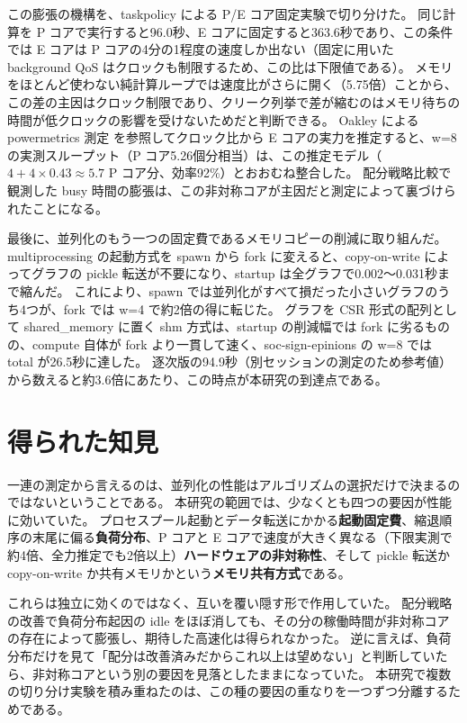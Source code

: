 この膨張の機構を、taskpolicy による P/E コア固定実験で切り分けた。
同じ計算を P コアで実行すると96.0秒、E コアに固定すると363.6秒であり、この条件では E コアは P コアの4分の1程度の速度しか出ない（固定に用いた background QoS はクロックも制限するため、この比は下限値である）。
メモリをほとんど使わない純計算ループでは速度比がさらに開く（5.75倍）ことから、この差の主因はクロック制限であり、クリーク列挙で差が縮むのはメモリ待ちの時間が低クロックの影響を受けないためだと判断できる。
Oakley による powermetrics 測定 \cite{oakley2024} を参照してクロック比から E コアの実力を推定すると、w=8 の実測スループット（P コア5.26個分相当）は、この推定モデル（$4 + 4\times0.43 \approx 5.7$ P コア分、効率92\%）とおおむね整合した。
配分戦略比較で観測した busy 時間の膨張は、この非対称コアが主因だと測定によって裏づけられたことになる。

最後に、並列化のもう一つの固定費であるメモリコピーの削減に取り組んだ。
multiprocessing の起動方式を spawn から fork に変えると、copy-on-write によってグラフの pickle 転送が不要になり、startup は全グラフで0.002〜0.031秒まで縮んだ。
これにより、spawn では並列化がすべて損だった小さいグラフのうち4つが、fork では w=4 で約2倍の得に転じた。
グラフを CSR 形式の配列として shared\_memory に置く shm 方式は、startup の削減幅では fork に劣るものの、compute 自体が fork より一貫して速く、soc-sign-epinions の w=8 では total が26.5秒に達した。
逐次版の94.9秒（別セッションの測定のため参考値）から数えると約3.6倍にあたり、この時点が本研究の到達点である。

\section{得られた知見}

一連の測定から言えるのは、並列化の性能はアルゴリズムの選択だけで決まるのではないということである。
本研究の範囲では、少なくとも四つの要因が性能に効いていた。
プロセスプール起動とデータ転送にかかる\textbf{起動固定費}、縮退順序の末尾に偏る\textbf{負荷分布}、P コアと E コアで速度が大きく異なる（下限実測で約4倍、全力推定でも2倍以上）\textbf{ハードウェアの非対称性}、そして pickle 転送か copy-on-write か共有メモリかという\textbf{メモリ共有方式}である。

これらは独立に効くのではなく、互いを覆い隠す形で作用していた。
配分戦略の改善で負荷分布起因の idle をほぼ消しても、その分の稼働時間が非対称コアの存在によって膨張し、期待した高速化は得られなかった。
逆に言えば、負荷分布だけを見て「配分は改善済みだからこれ以上は望めない」と判断していたら、非対称コアという別の要因を見落としたままになっていた。
本研究で複数の切り分け実験を積み重ねたのは、この種の要因の重なりを一つずつ分離するためである。

